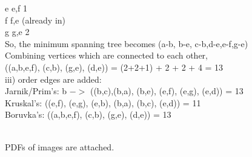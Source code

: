 \documentclass[12pt]{article}
\begin{document}
\begin{enumerate}
e \hspace*{40mm} e,f \hspace*{60mm} 1 \\
f \hspace*{40mm} f,e \hspace*{60mm} (already in) \\
g \hspace*{40mm} g,e \hspace*{60mm} 2 \\
So, the minimum spanning tree becomes (a-b, b-e, c-b,d-e,e-f,g-e)\\
Combining vertices which are connected to each other, \\
\hspace*{10mm} ((a,b,e,f), (c,b), (g,e), (d,e)) = (2+2+1) + 2 + 2 + 4 = 13\\

iii) order edges are added: \\
Jarnik/Prim's: b $->$ ((b,c),(b,a), (b,e), (e,f), (e,g), (e,d)) = 13 \\
Kruskal's: ((e,f), (e,g), (e,b), (b,a), (b,c), (e,d)) = 11 \\
Boruvka's: ((a,b,e,f), (c,b), (g,e), (d,e)) = 13





\\PDFs of images are attached. 
	

	
\end{enumerate}
\end{document}
